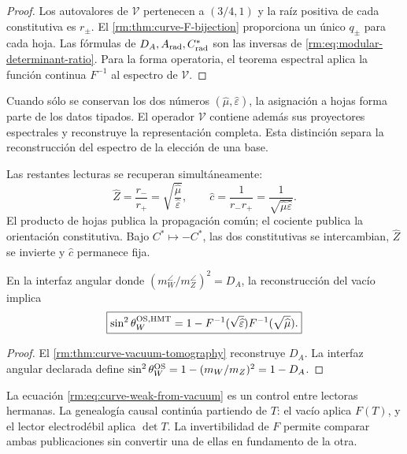 \begin{proof}
Los autovalores de \(\mathcal V\) pertenecen a \((3/4,1)\) y la ra\'iz
positiva de cada constitutiva es \(r_\pm\). El
\cref{rm:thm:curve-F-bijection} proporciona un \'unico \(q_\pm\) para cada
hoja. Las f\'ormulas de \(D_A,A_{\rm rad},C^*_{\rm rad}\) son las inversas
de \cref{rm:eq:modular-determinant-ratio}. Para la forma operatoria, el teorema
espectral aplica la funci\'on continua \(F^{-1}\) al espectro de
\(\mathcal V\).
\end{proof}

Cuando s\'olo se conservan los dos n\'umeros
\((\widehat\mu,\widehat\varepsilon)\), la asignaci\'on a hojas forma parte
de los datos tipados. El operador \(\mathcal V\) contiene adem\'as sus
proyectores espectrales y reconstruye la representaci\'on completa. Esta
distinci\'on separa la reconstrucci\'on del espectro de la elecci\'on de una
base.

Las restantes lecturas se recuperan simult\'aneamente:
\begin{equation}
 \widehat Z=\frac{r_-}{r_+}
 =\sqrt{\frac{\widehat\mu}{\widehat\varepsilon}},
 \qquad
 \widehat c=\frac1{r_-r_+}
 =\frac1{\sqrt{\widehat\mu\widehat\varepsilon}}.
 \label{rm:eq:curve-recover-Z-c}
\end{equation}
El producto de hojas publica la propagaci\'on com\'un; el cociente publica la
orientaci\'on constitutiva. Bajo \(C^*\mapsto-C^*\), las dos constitutivas se
intercambian, \(\widehat Z\) se invierte y \(\widehat c\) permanece fija.

\begin{corollary}
\label{rm:cor:curve-weak-control}
En la interfaz angular donde
\((m_W^{\angle}/m_Z^{\angle})^2=D_A\), la reconstrucci\'on del vac\'io
implica
\begin{equation}
 \boxed{
 \sin^2\theta_W^{\rm OS,HMT}
 =1-F^{-1}(\sqrt{\widehat\varepsilon})
      F^{-1}(\sqrt{\widehat\mu}).}
 \label{rm:eq:curve-weak-from-vacuum}
\end{equation}
\end{corollary}

\begin{proof}
El \cref{rm:thm:curve-vacuum-tomography} reconstruye \(D_A\). La interfaz
angular declarada define
\(\sin^2\theta_W^{\rm OS}=1-(m_W/m_Z)^2=1-D_A\).
\end{proof}

La ecuaci\'on \cref{rm:eq:curve-weak-from-vacuum} es un control entre lectoras
hermanas. La genealog\'ia causal contin\'ua partiendo de \(T\): el vac\'io
aplica \(F(T)\), y el lector electrod\'ebil aplica \(\det T\). La
invertibilidad de \(F\) permite comparar ambas publicaciones sin convertir
una de ellas en fundamento de la otra.

